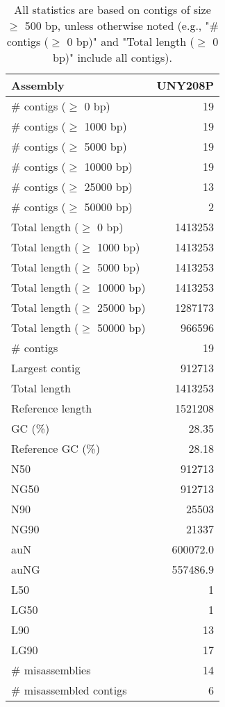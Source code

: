 \documentclass[12pt,a4paper]{article}
\begin{document}
\begin{table}[ht]
\begin{center}
\caption{All statistics are based on contigs of size $\geq$ 500 bp, unless otherwise noted (e.g., "\# contigs ($\geq$ 0 bp)" and "Total length ($\geq$ 0 bp)" include all contigs).}
\begin{tabular}{|l*{1}{|r}|}
\hline
Assembly & UNY208P \\ \hline
\# contigs ($\geq$ 0 bp) & 19 \\ \hline
\# contigs ($\geq$ 1000 bp) & 19 \\ \hline
\# contigs ($\geq$ 5000 bp) & 19 \\ \hline
\# contigs ($\geq$ 10000 bp) & 19 \\ \hline
\# contigs ($\geq$ 25000 bp) & 13 \\ \hline
\# contigs ($\geq$ 50000 bp) & 2 \\ \hline
Total length ($\geq$ 0 bp) & 1413253 \\ \hline
Total length ($\geq$ 1000 bp) & 1413253 \\ \hline
Total length ($\geq$ 5000 bp) & 1413253 \\ \hline
Total length ($\geq$ 10000 bp) & 1413253 \\ \hline
Total length ($\geq$ 25000 bp) & 1287173 \\ \hline
Total length ($\geq$ 50000 bp) & 966596 \\ \hline
\# contigs & 19 \\ \hline
Largest contig & 912713 \\ \hline
Total length & 1413253 \\ \hline
Reference length & 1521208 \\ \hline
GC (\%) & 28.35 \\ \hline
Reference GC (\%) & 28.18 \\ \hline
N50 & 912713 \\ \hline
NG50 & 912713 \\ \hline
N90 & 25503 \\ \hline
NG90 & 21337 \\ \hline
auN & 600072.0 \\ \hline
auNG & 557486.9 \\ \hline
L50 & 1 \\ \hline
LG50 & 1 \\ \hline
L90 & 13 \\ \hline
LG90 & 17 \\ \hline
\# misassemblies & 14 \\ \hline
\# misassembled contigs & 6 \\ \hline

\end{tabular}
\end{center}
\end{table}
\end{document}
